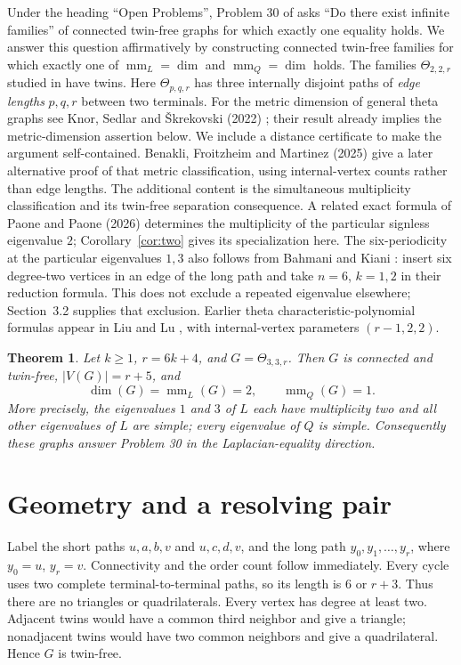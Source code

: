 \documentclass[11pt]{article}
\newtheorem{theorem}{Theorem}
\newcommand{\mm}{\operatorname{mm}}
\newcommand{\Th}{\Theta}
\begin{document}
Under the heading ``Open Problems'', Problem 30 of
\cite[Section~9, p.~27]{AKS} asks ``Do there exist infinite families''
of connected twin-free graphs for which exactly one equality holds.
We answer this question affirmatively by constructing connected twin-free
families for which exactly one of $\mm_L=\dim$ and $\mm_Q=\dim$ holds.
The families $\Th_{2,2,r}$ studied in \cite[Theorem~25 and Corollary~26]{AKS}
have twins. Here $\Th_{p,q,r}$ has three internally disjoint paths of
\emph{edge lengths} $p,q,r$ between two terminals.
For the metric dimension of general theta graphs see
Knor, Sedlar and \v{S}krekovski (2022)
\cite[arXiv version, Theorems~8 and~14, pp.~6 and~10]{KSS}; their result already
implies the metric-dimension assertion below. We include a distance
certificate to make the argument self-contained.
Benakli, Froitzheim and Martinez (2025)
\cite[Theorem~4.4, p.~11]{BFM} give a later alternative proof of that
metric classification, using internal-vertex counts rather than edge lengths.
The additional content is the simultaneous multiplicity classification and
its twin-free separation consequence. A related exact formula of
Paone and Paone (2026) \cite[Corollary~8.1, pp.~10--11]{PP}
determines the multiplicity of the particular signless eigenvalue $2$;
Corollary~\ref{cor:two} gives its specialization here.
The six-periodicity at the particular eigenvalues $1,3$ also follows from
Bahmani and Kiani \cite[Corollary~16 and Example~17, pp.~5--6]{BK}:
insert six degree-two vertices in an edge of the long path and take
$n=6$, $k=1,2$ in their reduction formula. This does not exclude a
repeated eigenvalue elsewhere; Section~3.2 supplies that exclusion.
Earlier theta characteristic-polynomial formulas appear in
Liu and Lu \cite[Proposition~2.6 and equations (2.1), (2.3)]{LL},
with internal-vertex parameters $(r-1,2,2)$.

\begin{theorem}\label{thm:main}
Let $k\geq1$, $r=6k+4$, and $G=\Th_{3,3,r}$. Then $G$ is connected and
twin-free, $|V(G)|=r+5$, and
\[
 \dim(G)=\mm_L(G)=2,\qquad \mm_Q(G)=1.
\]
More precisely, the eigenvalues $1$ and $3$ of $L$ each have multiplicity
two and all other eigenvalues of $L$ are simple; every eigenvalue of $Q$
is simple. Consequently these graphs answer Problem 30 in the
Laplacian-equality direction.
\end{theorem}

\section{Geometry and a resolving pair}
Label the short paths $u,a,b,v$ and $u,c,d,v$, and the long path
$y_0,y_1,\ldots,y_r$, where $y_0=u$, $y_r=v$.
Connectivity and the order count follow immediately.
Every cycle uses two complete terminal-to-terminal paths, so its length is
$6$ or $r+3$. Thus there are no triangles or quadrilaterals.
Every vertex has degree at least two. Adjacent twins would have a common
third neighbor and give a triangle; nonadjacent twins would have two
common neighbors and give a quadrilateral. Hence $G$ is twin-free.
\end{document}
